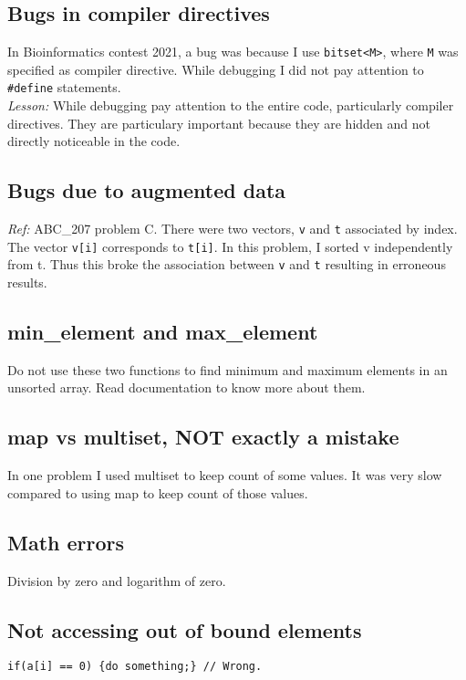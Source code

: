 \subsection{Bugs in compiler directives}
In Bioinformatics contest 2021, a bug was because I use \texttt{bitset<M>}, where \texttt{M} was specified as compiler directive. While debugging I did not pay attention to \texttt{\#define} statements.\\ 
\textit{Lesson:} While debugging pay attention to the entire code, particularly compiler directives. They are particulary important because they are hidden and not directly noticeable in the code.

\subsection{Bugs due to augmented data}
\textit{Ref:} ABC\_207 problem C.
There were two vectors, \texttt{v} and \texttt{t} associated by index. The vector \texttt{v[i]} corresponds to \texttt{t[i]}. In this problem, I sorted v independently from t. Thus this broke the association between \texttt{v} and \texttt{t} resulting in erroneous results.\\

\subsection{min\_element and max\_element}
Do not use these two functions to find minimum and maximum elements in an unsorted array. Read documentation to know more about them. 


\subsection{map vs multiset, NOT exactly a mistake}
In one problem I used multiset to keep count of some values. It was very slow compared to using map to keep count of those values.

\subsection{Math errors}
Division by zero and logarithm of zero.

\subsection{Not accessing out of bound elements}
\vspace{6pt}
\begin{verbatim}
if(a[i] == 0) {do something;} // Wrong.
\end{verbatim}

